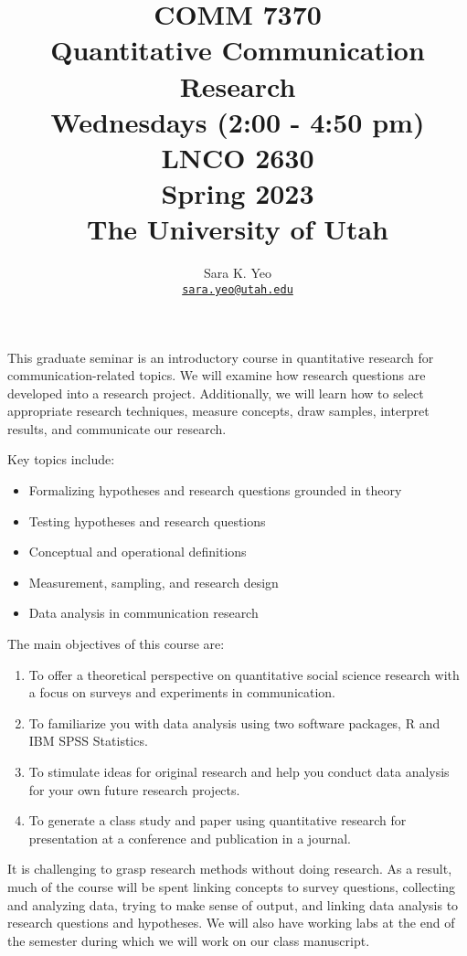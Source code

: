 \documentclass[
  letterpaper,
  DIV=11,
  numbers=noendperiod]{scrartcl}
\title{COMM 7370\\
Quantitative Communication Research\\
\vspace{0.5cm} \large Wednesdays (2:00 - 4:50 pm)\\
LNCO 2630\\
\vspace{0.5cm} Spring 2023\\
The University of Utah}
\author{Sara K. Yeo\\
\href{mailto:sara.yeo@utah.edu}{\nolinkurl{sara.yeo@utah.edu}}}
\date{}
\begin{document}
\maketitle
\ifdefined\Shaded\renewenvironment{Shaded}{\begin{tcolorbox}[breakable, borderline west={3pt}{0pt}{shadecolor}, interior hidden, enhanced, sharp corners, frame hidden, boxrule=0pt]}{\end{tcolorbox}}\fi

This graduate seminar is an introductory course in quantitative research
for communication-related topics. We will examine how research questions
are developed into a research project. Additionally, we will learn how
to select appropriate research techniques, measure concepts, draw
samples, interpret results, and communicate our research.

Key topics include:

\begin{itemize}
\item
  Formalizing hypotheses and research questions grounded in theory
\item
  Testing hypotheses and research questions
\item
  Conceptual and operational definitions
\item
  Measurement, sampling, and research design
\item
  Data analysis in communication research
\end{itemize}

The main objectives of this course are:

\begin{enumerate}
\def\labelenumi{\arabic{enumi}.}
\item
  To offer a theoretical perspective on quantitative social science
  research with a focus on surveys and experiments in communication.
\item
  To familiarize you with data analysis using two software packages, R
  and IBM SPSS Statistics.
\item
  To stimulate ideas for original research and help you conduct data
  analysis for your own future research projects.
\item
  To generate a class study and paper using quantitative research for
  presentation at a conference and publication in a journal.
\end{enumerate}

It is challenging to grasp research methods without doing research. As a
result, much of the course will be spent linking concepts to survey
questions, collecting and analyzing data, trying to make sense of
output, and linking data analysis to research questions and hypotheses.
We will also have working labs at the end of the semester during which
we will work on our class manuscript.
\end{document}
